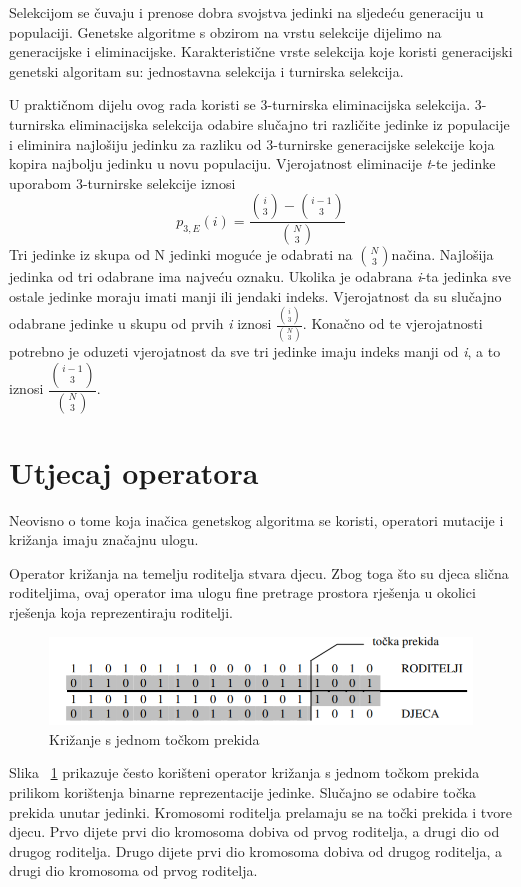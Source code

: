\documentclass[times, utf8, zavrsni, numeric]{fer}
\begin{document}
Selekcijom se čuvaju i prenose dobra svojstva jedinki na sljedeću generaciju u populaciji. Genetske algoritme s obzirom na vrstu selekcije dijelimo na generacijske i eliminacijske. Karakteristične vrste selekcija koje koristi generacijski genetski algoritam su: jednostavna selekcija i turnirska selekcija.

U praktičnom dijelu ovog rada koristi se 3-turnirska eliminacijska selekcija.
3-turnirska eliminacijska selekcija odabire slučajno tri različite jedinke iz populacije i eliminira najlošiju jedinku za razliku od 3-turnirske generacijske selekcije koja kopira najbolju jedinku u novu populaciju. Vjerojatnost eliminacije \textit{t}-te jedinke uporabom 3-turnirske selekcije iznosi 
\[p_{3,E}(i) = \frac{\binom{i}{3} - \binom{i-1}{3}}{\binom{N}{3}}\] 
Tri jedinke iz skupa od N jedinki moguće je odabrati na $\binom{N}{3} $načina. Najlošija jedinka od tri odabrane ima najveću oznaku. Ukolika je odabrana \textit{i}-ta jedinka sve ostale jedinke moraju imati manji ili jendaki indeks. Vjerojatnost da su slučajno odabrane jedinke u skupu od prvih \textit{i} iznosi $\frac{\binom{i}{3}}{\binom{N}{3}}$. Konačno od te vjerojatnosti potrebno je oduzeti vjerojatnost da sve tri jedinke imaju indeks manji od \textit{i}, a to iznosi $\dfrac{\binom{i-1}{3}}{\binom{N}{3}}$.

\section{Utjecaj operatora}
Neovisno o tome koja inačica genetskog algoritma se koristi, operatori mutacije i križanja imaju značajnu ulogu.

Operator križanja na temelju roditelja stvara djecu. Zbog toga što su djeca slična roditeljima, ovaj operator ima ulogu fine pretrage prostora rješenja u okolici rješenja koja reprezentiraju roditelji.

\begin{figure}[htb]
	\includegraphics[width=\linewidth]{slike/crossover2.PNG}
	\centering
	\caption{Križanje s jednom točkom prekida}
	\label{fig:crossover2}
\end{figure}

Slika ~\ref{fig:crossover2} prikazuje često korišteni operator križanja s jednom točkom prekida prilikom korištenja binarne reprezentacije jedinke. Slučajno se odabire točka prekida unutar jedinki. Kromosomi roditelja prelamaju se na točki prekida i tvore djecu. Prvo dijete prvi dio kromosoma dobiva od prvog roditelja, a drugi dio od drugog roditelja. Drugo dijete prvi dio kromosoma dobiva od drugog roditelja, a drugi dio kromosoma od prvog roditelja.
\end{document}
